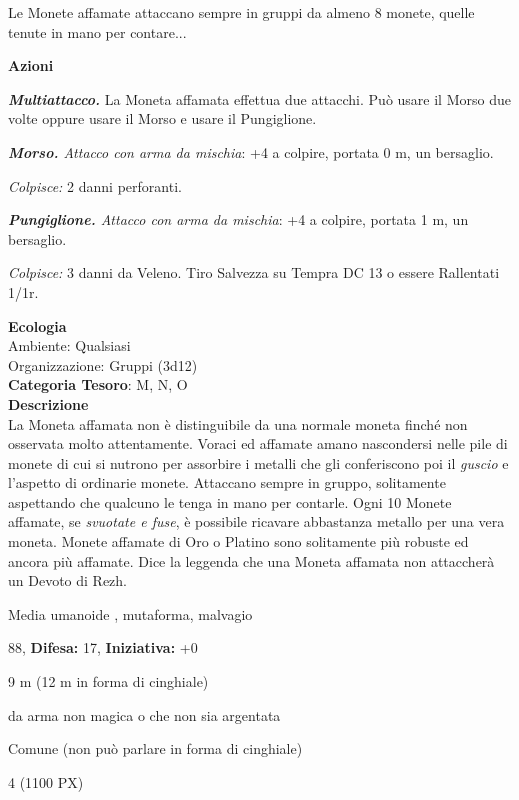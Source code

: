\begin{multicols}{2}
{Le Monete affamate attaccano sempre in gruppi da almeno 8 monete, quelle tenute in mano per contare...

\textbf{Azioni}

\emph{\textbf{Multiattacco.}} La Moneta affamata effettua due attacchi. Può usare il Morso due volte oppure usare il Morso e usare il Pungiglione.

\emph{\textbf{Morso.} Attacco con arma da mischia}: +4 a colpire, portata 0 m, un bersaglio.

\emph{Colpisce:} 2 danni perforanti.

\emph{\textbf{Pungiglione.} Attacco con arma da mischia}: +4 a colpire, portata 1 m, un bersaglio.

\emph{Colpisce:} 3 danni da Veleno. Tiro Salvezza su Tempra DC 13 o essere Rallentati 1/1r.

\textbf{Ecologia}\\
Ambiente: Qualsiasi\\
Organizzazione: Gruppi (3d12)\\
\textbf{Categoria Tesoro}: M, N, O\\
\textbf{Descrizione}\\
La Moneta affamata non è distinguibile da una normale moneta finché non osservata molto attentamente.
Voraci ed affamate amano nascondersi nelle pile di monete di cui si nutrono per assorbire i metalli che gli conferiscono poi il \emph{guscio} e l'aspetto di ordinarie monete. Attaccano sempre in gruppo, solitamente aspettando che qualcuno le tenga in mano per contarle. Ogni 10 Monete affamate, se \emph{svuotate e fuse}, è possibile ricavare abbastanza metallo per una vera moneta.
Monete affamate di Oro o Platino sono solitamente più robuste ed ancora più affamate. Dice la leggenda che una Moneta affamata non attaccherà un Devoto di Rezh.

\noindent
\begin{description}[noitemsep, topsep=0pt, parsep=0pt, partopsep=0pt, leftmargin=0cm, labelwidth=2.2cm]
	\item[\textbf{Taglia/Tipo:}] Media umanoide , mutaforma, malvagio
	\item[\textbf{Caratt.:}] 
	\item[\textbf{Punti Ferita:}] 88,  \textbf{Difesa:} 17,  \textbf{Iniziativa:} +0
	\item[\textbf{Movimento:}] 9 m (12 m in forma di cinghiale)
	\item[\textbf{Tiri Salvez.:}] 
	\item[\textbf{Imm. Danni:}] da arma non magica o che non sia argentata
	\item[\textbf{Linguaggi:}] Comune (non può parlare in forma di cinghiale)
	\item[\textbf{Sfida:}] 4 (1100 PX)\smallskip
\end{description}

}
\end{multicols}
